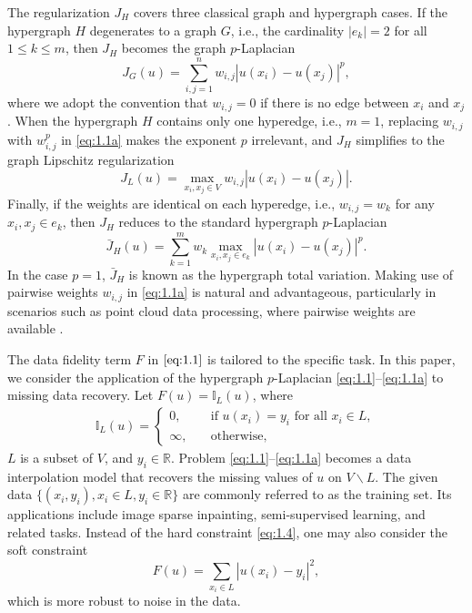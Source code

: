 \documentclass{article}
\theoremstyle{definition}
\begin{document}
The regularization $J_H$ covers three classical graph and hypergraph cases.
If the hypergraph $H$ degenerates to a graph $G$, i.e., the cardinality $|e_k|=2$ for all $1\leq k\leq m$, then $J_H$ becomes the graph $p$-Laplacian \cite{elmoataz2015p,flores2022analysis}
\begin{equation}\label{eq:GL}
  J_G(u)=\sum_{i,j=1}^n w_{i,j}|u(x_i)-u(x_j)|^p,
\end{equation}
where we adopt the convention that $w_{i,j}=0$ if there is no edge between $x_i$ and $x_j$.
When the hypergraph $H$ contains only one hyperedge, i.e., $m = 1$, replacing $w_{i,j}$ with $w_{i,j}^p$ in \eqref{eq:1.1a} makes the exponent $p$ irrelevant, and $J_H$ simplifies to the graph Lipschitz regularization \cite{kyng2015algorithms,roith2023continuum}
\begin{equation}\label{eq:1.2}
  J_L(u)=\max_{x_i,x_j\in V}w_{i,j}|u(x_i)-u(x_j)|.
\end{equation}
Finally, if the weights are identical on each hyperedge, i.e., $w_{i,j}=w_k$ for any $x_i,x_j\in e_k$, then $J_H$ reduces to the standard hypergraph $p$-Laplacian \cite{hein2013total}
\begin{equation*}
  \bar{J}_H(u)=\sum_{k=1}^m w_k\max_{x_i,x_j\in e_k}|u(x_i)-u(x_j)|^p.
\end{equation*}
In the case $p = 1$, $\bar{J}_H$ is known as the hypergraph total variation.
Making use of pairwise weights $w_{i,j}$ in \eqref{eq:1.1a} is natural and advantageous, particularly in scenarios such as point cloud data processing, where pairwise weights are available \cite{shi2025hypergraph}.



The data fidelity term $F$ in $\eqref{eq:1.1}$ is tailored to the specific task.
In this paper, we consider the application of the hypergraph $p$-Laplacian \eqref{eq:1.1}--\eqref{eq:1.1a} to missing data recovery.
Let
$F(u)=\mathbb{I}_{L}(u)$, where
\begin{align}\label{eq:1.4}
   \mathbb{I}_{L}(u)=
   \begin{cases}
     0,\quad &\mbox{if } u(x_i)=y_i \mbox{ for all } x_i\in L,\\
     \infty,\quad &\mbox{otherwise},
   \end{cases}
 \end{align}
$L$ is a subset of $V$, and $y_i\in\mathbb{R}$.
Problem \eqref{eq:1.1}--\eqref{eq:1.1a} becomes a data interpolation model that recovers the missing values of $u$ on $V\backslash L$. The given data $\{(x_i,y_i), x_i\in L, y_i\in \mathbb{R}\}$ are commonly referred to as the training set. Its applications include image sparse inpainting, semi-supervised learning, and related tasks.
Instead of the hard constraint \eqref{eq:1.4}, one may also consider the soft constraint
\begin{equation*}
  F(u)=\sum_{x_i\in L}|u(x_i)-y_i|^2,
\end{equation*}
which is more robust to noise in the data.
\end{document}
